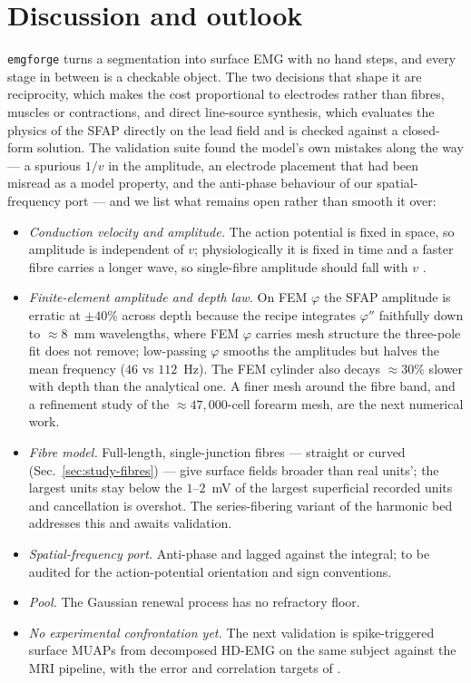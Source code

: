 \documentclass[11pt,a4paper]{article}
\newcommand{\emgforge}{\texttt{emgforge}}
\begin{document}
\section{Discussion and outlook}
\label{sec:discussion}

\emgforge{} turns a segmentation into surface EMG with no hand steps, and every stage
in between is a checkable object. The two decisions that shape it are reciprocity, which
makes the cost proportional to electrodes rather than fibres, muscles or contractions,
and direct line-source synthesis, which evaluates the physics of the SFAP directly on the
lead field and is checked against a closed-form solution. The validation suite found the
model's own mistakes along the way --- a spurious $1/v$ in the amplitude, an electrode
placement that had been misread as a model property, and the anti-phase behaviour of our
spatial-frequency port --- and we list what remains open rather than smooth it over:

\begin{itemize}
\item \emph{Conduction velocity and amplitude.} The action potential is fixed in space,
  so amplitude is independent of $v$; physiologically it is fixed in time and a faster
  fibre carries a longer wave, so single-fibre amplitude should fall with $v$
  \citep{nandedkar1983simulation}.
\item \emph{Finite-element amplitude and depth law.} On FEM $\varphi$ the SFAP amplitude
  is erratic at $\pm40\%$ across depth because the recipe integrates $\varphi''$
  faithfully down to $\approx8$~mm wavelengths, where FEM $\varphi$ carries mesh structure
  the three-pole fit does not remove; low-passing $\varphi$ smooths the amplitudes but
  halves the mean frequency ($46$ vs $112$~Hz). The FEM cylinder also decays $\approx30\%$
  slower with depth than the analytical one. A finer mesh around the fibre band, and a
  refinement study of the $\approx47{,}000$-cell forearm mesh, are the next numerical work.
\item \emph{Fibre model.} Full-length, single-junction fibres --- straight or curved
  (Sec.~\ref{sec:study-fibres}) --- give surface fields broader than real units'; the largest units stay below the $1$--$2$~mV of the
  largest superficial recorded units and cancellation is overshot. The series-fibering
  variant of the harmonic bed addresses this and awaits validation.
\item \emph{Spatial-frequency port.} Anti-phase and lagged against the integral; to be
  audited for the action-potential orientation and sign conventions.
\item \emph{Pool.} The Gaussian renewal process has no refractory floor.
\item \emph{No experimental confrontation yet.} The next validation is spike-triggered
  surface MUAPs from decomposed HD-EMG on the same subject against the MRI pipeline, with
  the error and correlation targets of \citet{lowery2004volume, botelho2019anatomically}.
\end{itemize}
\end{document}
